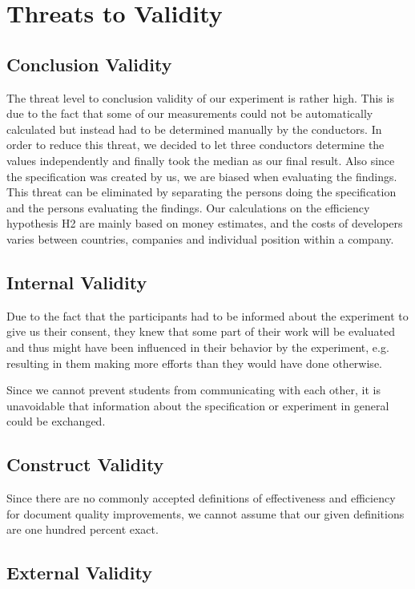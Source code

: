 \section{Threats to Validity}

\subsection{Conclusion Validity}

The threat level to conclusion validity of our experiment is rather high. This is due to the fact
that some of our measurements could not be automatically calculated but instead had to be determined
manually by the conductors. In order to reduce this threat, we decided to let three conductors
determine the values independently and finally took the median as our final result.
Also since the specification was created by us, we are biased when evaluating the findings. This threat can be eliminated by separating the persons doing the specification and the persons evaluating the findings.
Our calculations on the efficiency hypothesis H2 are mainly based on money estimates, and the costs of developers varies between countries, companies and individual position within a company.

\subsection{Internal Validity}

Due to the fact that the participants had to be informed about the experiment to give us their
consent, they knew that some part of their work will be evaluated and thus might have been
influenced in their behavior by the experiment, e.g. resulting in them making more efforts than they would have done otherwise.

Since we cannot prevent students from communicating with each other, it is unavoidable that information about the specification or experiment in general could be exchanged.

\subsection{Construct Validity}

Since there are no commonly accepted definitions of effectiveness and efficiency for document quality improvements, we cannot assume that our given definitions are one hundred percent exact.

\subsection{External Validity}

